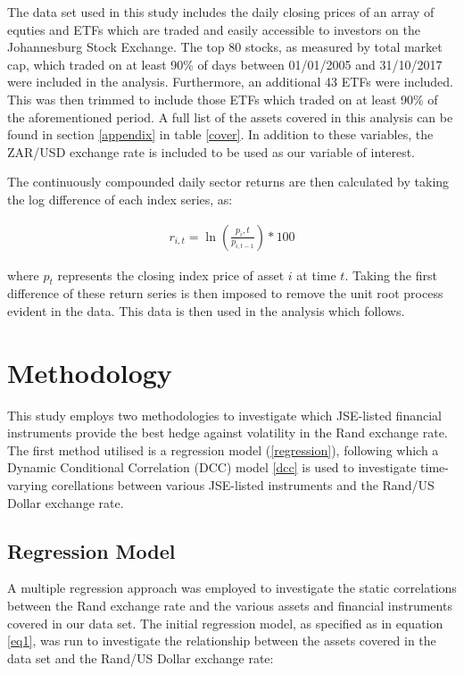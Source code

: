 \documentclass[11pt,preprint, authoryear]{elsarticle}
\numberwithin{equation}{section}
\numberwithin{figure}{section}
\numberwithin{table}{section}
\begin{document}
The data set used in this study includes the daily closing prices of an
array of equties and ETFs which are traded and easily accessible to
investors on the Johannesburg Stock Exchange. The top 80 stocks, as
measured by total market cap, which traded on at least 90\% of days
between 01/01/2005 and 31/10/2017 were included in the analysis.
Furthermore, an additional 43 ETFs were included. This was then trimmed
to include those ETFs which traded on at least 90\% of the
aforementioned period. A full list of the assets covered in this
analysis can be found in section \ref{appendix} in table \ref{cover}. In
addition to these variables, the ZAR/USD exchange rate is included to be
used as our variable of interest.

The continuously compounded daily sector returns are then calculated by
taking the log difference of each index series, as:

\begin{align}
r _ { i ,t } = \operatorname{ln} ( \frac { p _ { i } ,t } { p _ { i ,t - 1} } ) * 100 
\end{align}

where \(p_t\) represents the closing index price of asset \(i\) at time
\(t\). Taking the first difference of these return series is then
imposed to remove the unit root process evident in the data. This data
is then used in the analysis which follows.

\pagebreak

\section{Methodology}\label{methodology}

This study employs two methodologies to investigate which JSE-listed
financial instruments provide the best hedge against volatility in the
Rand exchange rate. The first method utilised is a regression model
(\ref{regression}), following which a Dynamic Conditional Correlation
(DCC) model \ref{dcc} is used to investigate time-varying corellations
between various JSE-listed instruments and the Rand/US Dollar exchange
rate.

\subsection{\texorpdfstring{Regression Model
\label{regression}}{Regression Model }}\label{regression-model}

A multiple regression approach was employed to investigate the static
correlations between the Rand exchange rate and the various assets and
financial instruments covered in our data set. The initial regression
model, as specified as in equation \ref{eq1}, was run to investigate the
relationship between the assets covered in the data set and the Rand/US
Dollar exchange rate:
\end{document}
